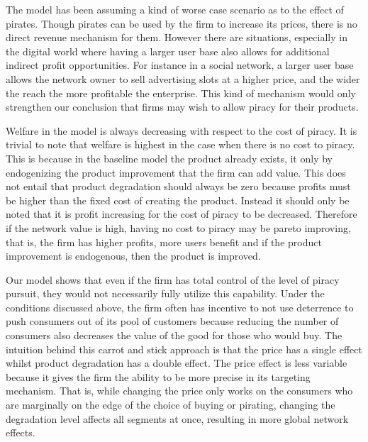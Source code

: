 \documentclass[11pt]{article}
\begin{document}
The model has been assuming a kind of worse case scenario as to the effect of pirates. Though pirates can be used by the firm to increase its prices, there is no direct revenue mechanism for them. However there are situations, especially in the digital world where having a larger user base also allows for additional indirect profit opportunities. For instance in a social network, a larger user base allows the network owner to sell advertising slots at a higher price, and the wider the reach the more profitable the enterprise. This kind of mechanism would only strengthen our conclusion that firms may wish to allow piracy for their products. 

Welfare in the model is always decreasing with respect to the cost of piracy. It is trivial to note that welfare is highest in the case when there is no cost to piracy. This is because in the baseline model the product already exists, it only by endogenizing the product improvement that the firm can add value. This does not entail that product degradation should always be zero because profits must be higher than the fixed cost of creating the product. Instead it should only be noted that it is profit increasing for the cost of piracy to be decreased. Therefore if the network value is high, having no cost to piracy may be pareto improving, that is, the firm has higher profits, more users benefit and if the product improvement is endogenous, then the product is improved. 



Our model shows that even if the firm has total control of the level of piracy pursuit, they would not necessarily fully utilize this capability. Under the conditions discussed above, the firm often has incentive to not use deterrence to push consumers out of its pool of customers because reducing the number of consumers also decreases the value of the good for those who would buy. The intuition behind this carrot and stick approach is that the price has a single effect whilst product degradation has a double effect. The price effect is less variable because it gives the firm the ability to be more precise in its targeting mechanism. That is, while changing the price only works on the consumers who are marginally on the edge of the choice of buying or pirating, changing the degradation level affects all segments at once, resulting in more global network effects. 
\end{document}
